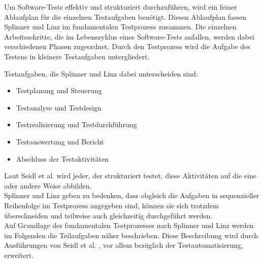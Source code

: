 Um Software-Tests effektiv und strukturiert durchzuführen, wird ein feiner Ablaufplan für die einzelnen Testaufgaben benötigt. Diesen Ablaufplan fassen Splinner und Linz \cite{spillner_basiswissen_2007} im fundamentalen Testprozess zusammen. Die einzelnen Arbeitsschritte, die im Lebenszyklus eines Software-Tests anfallen, werden dabei verschiedenen Phasen zugeordnet.
Durch den Testprozess wird die Aufgabe des Testens in kleinere Testaufgaben untergliedert.

Testaufgaben, die Splinner und Linz \cite{spillner_basiswissen_2007} dabei unterscheiden sind:

\begin{itemize}
	  \itemsep0pt
      \item Testplanung und Steuerung
      \item Testanalyse und Testdesign
      \item Testrealisierung und Testdurchführung
      \item Testauswertung und Bericht
      \item Abschluss der Testaktivitäten       
\end{itemize}

Laut Seidl et al. \cite[S. 9]{seidl_basiswissen_2012} wird jeder, der strukturiert testet, diese Aktivitäten auf die eine oder andere Weise abbilden.\\
Splinner und Linz \cite[S.19]{spillner_basiswissen_2007} geben zu bedenken, dass obgleich die Aufgaben in sequenzieller Reihenfolge im Testprozess angegeben sind, können sie sich trotzdem überschneiden und teilweise auch gleichzeitig durchgeführt werden. \\ Auf Grundlage des fundamentalen Testprozesses nach Splinner und Linz \cite[S.20ff]{spillner_basiswissen_2007} werden im Folgenden die Teilaufgaben näher beschrieben. 
Diese Beschreibung wird durch Ausführungen von Seidl et al. \cite[S. 9 ff.]{seidl_basiswissen_2012}, vor allem bezüglich der Testautomatisierung, erweitert. 


